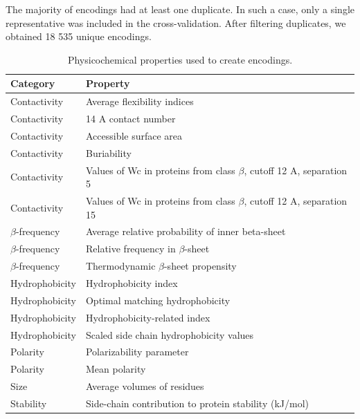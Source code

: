 \documentclass[a4,center,fleqn]{NAR}
\begin{document}
  The majority of encodings had at least one duplicate. In such a case, only a 
single representative was included in the cross-validation. After filtering 
duplicates, we obtained 18 535 unique encodings.
\begin{table}[bth]
\begin{tabularx}{\columnwidth}{@{} lX @{}}
  \toprule
  Category & Property \\ 
  \midrule
  Contactivity & Average flexibility indices \citep{bhaskaran_positional_1988} \\ 
  Contactivity & 14 A contact number \citep{nishikawa_radial_1986} \\ 
  Contactivity & Accessible surface area \citep{radzicka_comparing_1988} \\ 
  Contactivity & Buriability \citep{zhou_quantifying_2004} \\ 
  Contactivity & Values of Wc in proteins from class $\beta$, \newline  cutoff 12 A, separation 5 \citep{wozniak_characteristics_2014} \\ 
  Contactivity & Values of Wc in proteins from class $\beta$, \newline  cutoff 12 A, separation 15 \citep{wozniak_characteristics_2014} \\ 
  $\beta$-frequency & Average relative probability of inner \newline beta-sheet \citep{kanehisa_local_1980} \\ 
  $\beta$-frequency & Relative frequency in $\beta$-sheet \citep{prabhakaran_distribution_1990} \\ 
  $\beta$-frequency & Thermodynamic $\beta$-sheet propensity \citep{kim_thermodynamic_1993} \\ 
  Hydrophobicity & Hydrophobicity index \citep{argos_structural_1982} \\ 
  Hydrophobicity & Optimal matching hydrophobicity \citep{sweet_correlation_1983} \\ 
  Hydrophobicity & Hydrophobicity-related index \citep{kidera_statistical_1985} \\ 
  Hydrophobicity & Scaled side chain hydrophobicity values \citep{black_development_1991} \\ 
  Polarity & Polarizability parameter \citep{charton_structural_1982} \\ 
  Polarity & Mean polarity \citep{radzicka_comparing_1988} \\ 
  Size & Average volumes of residues \citep{pontius_deviations_1996} \\ 
  Stability & Side-chain contribution to protein stability (kJ/mol) \citep{takano_new_2001} \\
  \bottomrule
\end{tabularx}
\caption{Physicochemical properties used to create encodings.} 
\label{tab:properties}
\end{table}
\end{document}
